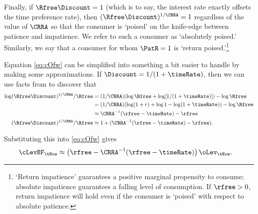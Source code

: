Finally, if $\Rfree\Discount=1$ (which is to say, the interest rate
exactly offsets the time preference rate), then $(\Rfree\Discount)^{1/\CRRA}=1$ regardless of the value of
$\CRRA$ so that the consumer is `poised' on the knife-edge between
patience and impatience.  We refer to
such a consumer as `absolutely poised.'  Similarly, we say that a consumer for
whom $\PatR=1$ is `return poised.'\footnote{`Return impatience' guarantees a positive marginal propensity to consume; absolute
impatience guarantees a falling level of consumption.  If $\rfree > 0$, return impatience
will hold even if the consumer is `poised' with respect to absolute patience.}




Equation \eqref{eq:cOfw} can be simplified into something a bit
easier to handle by making some approximations.  If $\Discount =
1/(1+\timeRate)$, then we can use facts from  to discover that
\begin{equation*}\begin{gathered}\begin{aligned}
      \log (\Rfree\Discount)^{1/\CRRA}/\Rfree & =  (1/\CRRA) (\log \Rfree + \log [1/(1+\timeRate) ]) - \log \Rfree  \\
     & =  (1/\CRRA) (\log(1+r) + \log 1 - \log (1+\timeRate) ) - \log \Rfree  \\
         & \approx  \CRRA^{-1}(\rfree -\timeRate)  - \rfree
\\      (\Rfree\Discount)^{1/\CRRA}/\Rfree & \approx  1+(\CRRA^{-1}(\rfree-\timeRate)-\rfree)
.
\end{aligned}\end{gathered}\end{equation*}

Substituting this into \eqref{eq:cOfw} gives
\begin{equation}\begin{gathered}\begin{aligned}
        \cLevBF_{\tNow} & \approx  \left(\rfree-\CRRA^{-1}(\rfree-\timeRate)\right)\oLev_{\tNow} \label{eq:capprox}
.
\end{aligned}\end{gathered}\end{equation}

